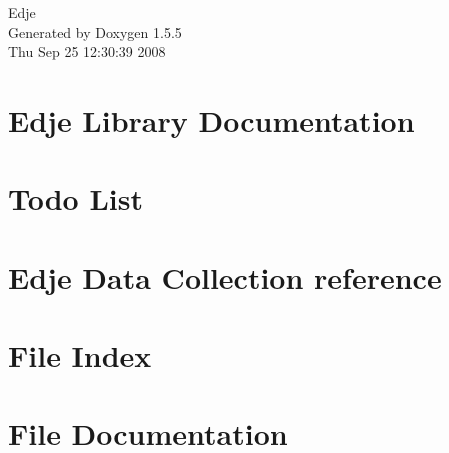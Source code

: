 \documentclass[a4paper]{book}
\begin{document}
\begin{titlepage}
\vspace*{7cm}
\begin{center}
{\Large Edje }\\
\vspace*{1cm}
{\large Generated by Doxygen 1.5.5}\\
\vspace*{0.5cm}
{\small Thu Sep 25 12:30:39 2008}\\
\end{center}
\end{titlepage}
\clearemptydoublepage
{}
\tableofcontents
\clearemptydoublepage
{}
\chapter{Edje Library Documentation }
\label{index}\hypertarget{index}{}
\chapter{Todo List}

\chapter{Edje Data Collection reference}

\chapter{File Index}

\chapter{File Documentation}


\printindex
\end{document}

